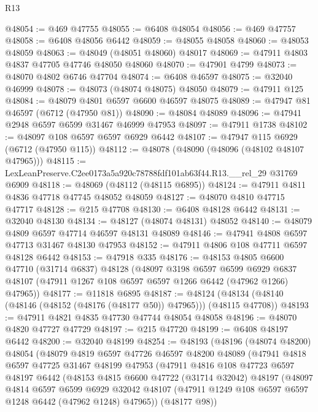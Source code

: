 \begin{lexlean}{R13}
\begin{coremodule}
@48054 := @469 @47755
@48055 := @6408 @48054
@48056 := @469 @47757
@48058 := @6408 @48056 @6442
@48059 := @48055 @48058
@48060 := @48053 @48059
@48063 := @48049 (@48051 @48060) @48017
@48069 := @47911 @4803 @4837 @47705 @47746 @48050 @48060
@48070 := @47901 @4799
@48073 := @48070 @4802 @6746 @47704
@48074 := @6408 @46597
@48075 := @32040 @46999
@48078 := @48073 (@48074 @48075) @48050
@48079 := @47911 @125
@48084 := @48079 @4801 @6597 @6600 @46597 @48075
@48089 := @47947 @81 @46597 (@6712 (@47950 @81))
@48090 := @48084 @48089
@48096 := @47941 @2948 @6597 @6599 @31467 @46999 @47953
@48097 := @47911 @1738
@48102 := @48097 @108 @6597 @6597 @6929 @6442
@48107 := @47947 @115 @6929 (@6712 (@47950 @115))
@48112 := @48078 (@48090 (@48096 (@48102 @48107 @47965)))
@48115 := LexLeanPreserve.C2ee0173a5a920c78788fdf101ab63f44.R13.__rel_29 @31769 @6909
@48118 := @48069 (@48112 (@48115 @6895))
@48124 := @47911 @4811 @4836 @47718 @47745 @48052 @48059
@48127 := @48070 @4810 @47715 @47717
@48128 := @215 @47708
@48130 := @6408 @48128 @6442
@48131 := @32040 @48130
@48134 := @48127 (@48074 @48131) @48052
@48140 := @48079 @4809 @6597 @47714 @46597 @48131 @48089
@48146 := @47941 @4808 @6597 @47713 @31467 @48130 @47953
@48152 := @47911 @4806 @108 @47711 @6597 @48128 @6442
@48153 := @47918 @335
@48176 := @48153
    @4805
    @6600
    @47710
    (@31714 @6837)
    @48128
    (@48097
      @3198
      @6597
      @6599
      @6929
      @6837
      @48107
      (@47911 @1267 @108 @6597 @6597 @1266 @6442 (@47962 @1266) @47965))
@48177 := @11818 @6895
@48187 := @48124 (@48134 (@48140 (@48146 (@48152 (@48176 (@48177 @50)) @47965))) (@48115 @47708))
@48193 := @47911 @4821 @4835 @47730 @47744 @48054 @48058
@48196 := @48070 @4820 @47727 @47729
@48197 := @215 @47720
@48199 := @6408 @48197 @6442
@48200 := @32040 @48199
@48254 := @48193
    (@48196
      (@48074 @48200)
      @48054
      (@48079
        @4819
        @6597
        @47726
        @46597
        @48200
        @48089
        (@47941
          @4818
          @6597
          @47725
          @31467
          @48199
          @47953
          (@47911
            @4816
            @108
            @47723
            @6597
            @48197
            @6442
            (@48153
              @4815
              @6600
              @47722
              (@31714 @32042)
              @48197
              (@48097
                @4814
                @6597
                @6599
                @6929
                @32042
                @48107
                (@47911 @1249 @108 @6597 @6597 @1248 @6442 (@47962 @1248) @47965))
              (@48177 @98))

\end{coremodule}
\end{lexlean}
